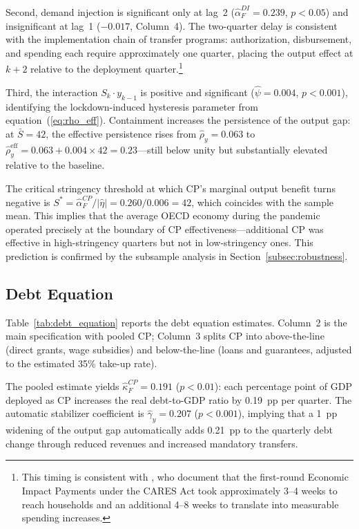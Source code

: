 Second, demand injection is significant only at lag~2 ($\hat{\alpha}_F^{DI} = 0.239$, $p < 0.05$) and insignificant at lag~1 ($-0.017$, Column~4). The two-quarter delay is consistent with the implementation chain of transfer programs: authorization, disbursement, and spending each require approximately one quarter, placing the output effect at $k+2$ relative to the deployment quarter.\footnote{This timing is consistent with \citet{chetty2020}, who document that the first-round Economic Impact Payments under the CARES Act took approximately 3--4 weeks to reach households and an additional 4--8 weeks to translate into measurable spending increases.}

Third, the interaction $S_k \cdot y_{k-1}$ is positive and significant ($\hat{\psi} = 0.004$, $p < 0.001$), identifying the lockdown-induced hysteresis parameter from equation~(\ref{eq:rho_eff}). Containment increases the persistence of the output gap: at $\bar{S} = 42$, the effective persistence rises from $\hat{\rho}_y = 0.063$ to $\hat{\rho}_y^{\text{eff}} = 0.063 + 0.004 \times 42 = 0.23$---still below unity but substantially elevated relative to the baseline.

The critical stringency threshold at which CP's marginal output benefit turns negative is $S^* = \hat{\alpha}_F^{CP} / |\hat{\eta}| = 0.260 / 0.006 = 42$, which coincides with the sample mean. This implies that the average OECD economy during the pandemic operated precisely at the boundary of CP effectiveness---additional CP was effective in high-stringency quarters but not in low-stringency ones. This prediction is confirmed by the subsample analysis in Section~\ref{subsec:robustness}.

%

\subsection{Debt Equation}
\label{subsec:debt_results}

Table~\ref{tab:debt_equation} reports the debt equation estimates. Column~2 is the main specification with pooled CP; Column~3 splits CP into above-the-line (direct grants, wage subsidies) and below-the-line (loans and guarantees, adjusted to the estimated 35\% take-up rate).

The pooled estimate yields $\hat{\kappa}_F^{CP} = 0.191$ ($p < 0.01$): each percentage point of GDP deployed as CP increases the real debt-to-GDP ratio by 0.19~pp per quarter. The automatic stabilizer coefficient is $\hat{\gamma}_y = 0.207$ ($p < 0.001$), implying that a 1~pp widening of the output gap automatically adds 0.21~pp to the quarterly debt change through reduced revenues and increased mandatory transfers.

